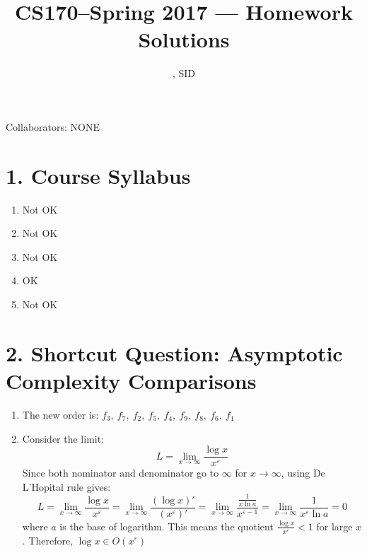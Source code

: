 \documentclass[11pt]{article}
\title{CS170--Spring 2017 --- Homework \Homework Solutions}
\author{\Name, SID \SID}
\date{}
\newcommand{\disp}{\displaystyle}
\newenvironment{qparts}{\begin{enumerate}[{(}a{)}]}{\end{enumerate}}
\begin{document}
\maketitle

Collaborators: NONE

\section*{1. Course Syllabus}
\begin{qparts}
\item
Not OK

\item
Not OK

\item
Not OK

\item
OK

\item
Not OK

\end{qparts}



\newpage
\section*{2. Shortcut Question: Asymptotic Complexity Comparisons}
\begin{qparts}
\item
The new order is: $f_3,\ f_7,\ f_2,\ f_5,\ f_4,\ f_9,\ f_8,\ f_6,\ f_1$

\item
Consider the limit:
%
\begin{equation}
	L = \lim_{x\rightarrow\infty}\frac{\log x}{x^{\varepsilon}}
\end{equation}
%
Since both nominator and denominator go to $\infty$ for $x\rightarrow\infty$, using De L'Hopital rule gives:
%
\begin{equation}
	L = \lim_{x\rightarrow\infty}\frac{\log x}{x^{\varepsilon}} = \lim_{x\rightarrow\infty}\frac{(\log x)'}{(x^{\varepsilon})'} = \lim_{x\rightarrow\infty}\frac{\frac{1}{x\ln a}}{x^{\varepsilon - 1}} = \lim_{x\rightarrow\infty}\frac{1}{x^{\varepsilon}\ln a} = 0
\end{equation}
%
where $a$ is the base of logarithm. This means the quotient $\disp\frac{\log x}{x^{\varepsilon}} < 1$ for large $x$. Therefore, $\log x \in O(x^{\varepsilon})$



\end{qparts}
\end{document}
